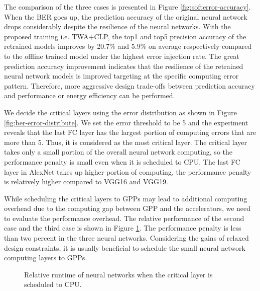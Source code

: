 The comparison of the three cases is presented in Figure \ref{fig:softerror-accuracy}.
When the BER goes up, the prediction accuracy of the original neural network drops 
considerably despite the resilience of the neural networks. 
With the proposed training i.e. TWA+CLP, the top1 and top5 precision accuracy 
of the retrained models improves by 20.7\% and 5.9\% on average respectively 
compared to the offline trained model under the highest error injection rate. 
The great prediction accuracy improvement indicates that the resilience 
of the retrained neural network models is improved targeting at the 
specific computing error pattern. Therefore, more aggressive design trade-offs 
between prediction accuracy and performance or energy efficiency can be performed. 

\begin{figure*}
        \caption{Error distribution across the neural network layers when highest BER is used in AlexNet, VGG16 and VGG19.}
        \label{fig:ber-error-distribute}
	\vspace{-1em}
\end{figure*}

We decide the critical layers using the error distribution as shown in Figure \ref{fig:ber-error-distribute}.
We set the error threshold to be 5 and the experiment reveals that the last FC 
layer has the largest portion of computing errors that are more than 5. Thus, it is considered as 
the most critical layer. The critical layer takes only a small portion of the overall 
neural network computing, so the performance penalty is small even 
when it is scheduled to CPU. The last FC layer in AlexNet takes up higher portion of computing, 
the performance penalty is relatively higher compared to VGG16 and VGG19.

While scheduling the critical layers to GPPs may lead to additional computing overhead
due to the computing gap between GPP and the accelerators, we need to evaluate the
performance overhead. The relative performance of the second case and the third case
is shown in Figure \ref{fig:clp_perf}. The performance penalty is less than two percent
in the three neural networks. Considering the gains of relaxed design constraints,
it is usually beneficial to schedule the small neural network computing layers to GPPs.
\begin{figure}
        \caption{Relative runtime of neural networks when the critical layer is scheduled to CPU.}
        \label{fig:clp_perf}
\end{figure}
